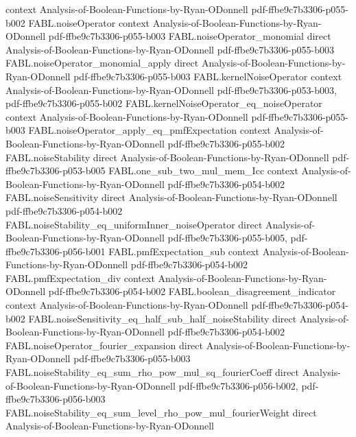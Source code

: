 \begin{theorem}
  {context}
  {Analysis-of-Boolean-Functions-by-Ryan-ODonnell}
  {pdf-ffbe9c7b3306-p055-b002}
\proofstep
  {FABL.noiseOperator}
  {context}
  {Analysis-of-Boolean-Functions-by-Ryan-ODonnell}
  {pdf-ffbe9c7b3306-p055-b003}
\proofstep
  {FABL.noiseOperator_monomial}
  {direct}
  {Analysis-of-Boolean-Functions-by-Ryan-ODonnell}
  {pdf-ffbe9c7b3306-p055-b003}
\proofstep
  {FABL.noiseOperator_monomial_apply}
  {direct}
  {Analysis-of-Boolean-Functions-by-Ryan-ODonnell}
  {pdf-ffbe9c7b3306-p055-b003}
\proofstep
  {FABL.kernelNoiseOperator}
  {context}
  {Analysis-of-Boolean-Functions-by-Ryan-ODonnell}
  {pdf-ffbe9c7b3306-p053-b003,
    pdf-ffbe9c7b3306-p055-b002}
\proofstep
  {FABL.kernelNoiseOperator_eq_noiseOperator}
  {context}
  {Analysis-of-Boolean-Functions-by-Ryan-ODonnell}
  {pdf-ffbe9c7b3306-p055-b003}
\proofstep
  {FABL.noiseOperator_apply_eq_pmfExpectation}
  {context}
  {Analysis-of-Boolean-Functions-by-Ryan-ODonnell}
  {pdf-ffbe9c7b3306-p055-b002}
\proofstep
  {FABL.noiseStability}
  {direct}
  {Analysis-of-Boolean-Functions-by-Ryan-ODonnell}
  {pdf-ffbe9c7b3306-p053-b005}
\proofstep
  {FABL.one_sub_two_mul_mem_Icc}
  {context}
  {Analysis-of-Boolean-Functions-by-Ryan-ODonnell}
  {pdf-ffbe9c7b3306-p054-b002}
\proofstep
  {FABL.noiseSensitivity}
  {direct}
  {Analysis-of-Boolean-Functions-by-Ryan-ODonnell}
  {pdf-ffbe9c7b3306-p054-b002}
\proofstep
  {FABL.noiseStability_eq_uniformInner_noiseOperator}
  {direct}
  {Analysis-of-Boolean-Functions-by-Ryan-ODonnell}
  {pdf-ffbe9c7b3306-p055-b005,
    pdf-ffbe9c7b3306-p056-b001}
\proofstep
  {FABL.pmfExpectation_sub}
  {context}
  {Analysis-of-Boolean-Functions-by-Ryan-ODonnell}
  {pdf-ffbe9c7b3306-p054-b002}
\proofstep
  {FABL.pmfExpectation_div}
  {context}
  {Analysis-of-Boolean-Functions-by-Ryan-ODonnell}
  {pdf-ffbe9c7b3306-p054-b002}
\proofstep
  {FABL.boolean_disagreement_indicator}
  {context}
  {Analysis-of-Boolean-Functions-by-Ryan-ODonnell}
  {pdf-ffbe9c7b3306-p054-b002}
\proofstep
  {FABL.noiseSensitivity_eq_half_sub_half_noiseStability}
  {direct}
  {Analysis-of-Boolean-Functions-by-Ryan-ODonnell}
  {pdf-ffbe9c7b3306-p054-b002}
\proofstep
  {FABL.noiseOperator_fourier_expansion}
  {direct}
  {Analysis-of-Boolean-Functions-by-Ryan-ODonnell}
  {pdf-ffbe9c7b3306-p055-b003}
\proofstep
  {FABL.noiseStability_eq_sum_rho_pow_mul_sq_fourierCoeff}
  {direct}
  {Analysis-of-Boolean-Functions-by-Ryan-ODonnell}
  {pdf-ffbe9c7b3306-p056-b002,
    pdf-ffbe9c7b3306-p056-b003}
\proofstep
  {FABL.noiseStability_eq_sum_level_rho_pow_mul_fourierWeight}
  {direct}
  {Analysis-of-Boolean-Functions-by-Ryan-ODonnell}

\end{theorem}
